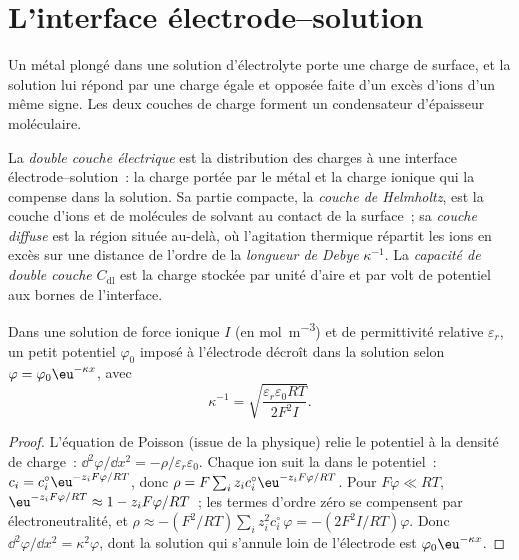 \section{L'interface électrode--solution}

Un métal plongé dans une solution d'électrolyte porte une charge de
surface, et la solution lui répond par une charge égale et opposée faite
d'un excès d'ions d'un même signe. Les deux couches de charge forment un
condensateur d'épaisseur moléculaire.

\begin{definition}\label{def:b3:electrode-kinetics:double-layer}
La \emph{double couche électrique} est
la distribution des charges à une interface électrode--solution~: la
charge portée par le métal et la charge ionique qui la compense dans la
solution. Sa partie compacte, la
\emph{couche de Helmholtz}, est la couche
d'ions et de molécules de solvant au contact de la surface~; sa
\emph{couche diffuse} est la région située au-delà,
où l'agitation thermique répartit les ions en excès sur une distance de
l'ordre de la \emph{longueur de Debye} $\kappa^{-1}$. La
\emph{capacité de double couche} $C_{\mathrm{dl}}$ est la charge
stockée par unité d'aire et par volt de potentiel aux bornes de
l'interface.
\end{definition}

\begin{proposition}\label{prop:b3:electrode-kinetics:debye-length}
Dans une solution de force ionique $I$ (en \unit{mol.m^{-3}}) et de
permittivité relative
$\varepsilon_r$, un petit potentiel $\varphi_0$ imposé à l'électrode
décroît dans la solution selon
$\varphi = \varphi_0\eu^{-\kappa x}$, avec
\[
  \kappa^{-1} = \sqrt{\frac{\varepsilon_r\varepsilon_0RT}{2F^2I}} .
\]
\end{proposition}

\begin{proof}
L'équation de Poisson (issue de la physique) relie le potentiel à la
densité de charge~:
$\dd^2\varphi/\dd x^2 = -\rho/\varepsilon_r\varepsilon_0$. Chaque ion
suit la  dans le
potentiel~: $c_i = c_i^{\circ}\eu^{-z_iF\varphi/RT}$, donc $\rho = F\sum_iz_ic_i^{\circ}\eu^{-z_iF\varphi/RT}$. Pour $F\varphi \ll RT$,
$\eu^{-z_iF\varphi/RT} \approx 1 - z_iF\varphi/RT$~; les termes d'ordre
zéro se compensent par électroneutralité,
et $\rho \approx -(F^2/RT)\sum_iz_i^2c_i^{\circ}\,\varphi = -(2F^2I/RT)\varphi$. Donc $\dd^2\varphi/\dd x^2 = \kappa^2\varphi$,
dont la solution qui s'annule loin de l'électrode est $\varphi_0\eu^{-\kappa x}$.
\end{proof}

